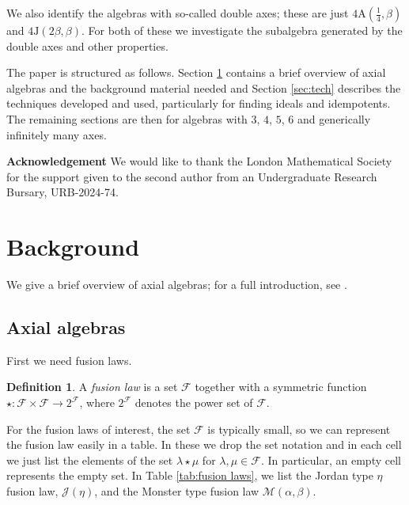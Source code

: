 \documentclass[11pt, a4paper]{article}
\theoremstyle{plain}
\theoremstyle{definition}
\newtheorem{definition}[theorem]{Definition}
\newcommand\al{\alpha}
\newcommand\bt{\beta}
\newcommand\lm{\lambda}
\newcommand\cF{\mathcal{F}}
\newcommand\cJ{\mathcal{J}}
\newcommand\cM{\mathcal{M}}
\newcommand{\A}{\mathrm{A}}
\newcommand{\J}{\mathrm{J}}
\newcommand{\0}{\overline{0}}
\newcommand{\2}{\overline{2}}
\newcommand{\1}{\mathbbm{1}}
\begin{document}
We also identify the algebras with so-called double axes; these are just $4\A(\frac{1}{4}, \bt)$ and $4\J(2\bt, \bt)$.  For both of these we investigate the subalgebra generated by the double axes and other properties.

The paper is structured as follows.  Section \ref{sec:background} contains a brief overview of axial algebras and the background material needed and Section \ref{sec:tech} describes the techniques developed and used, particularly for finding ideals and idempotents.  The remaining sections are then for algebras with $3$, $4$, $5$, $6$ and generically infinitely many axes.

\medskip

\noindent \textbf{Acknowledgement} We would like to thank the London Mathematical Society for the support given to the second author from an Undergraduate Research Bursary, URB-2024-74.

\section{Background}\label{sec:background}

We give a brief overview of axial algebras; for a full introduction, see \cite{survey}.

\subsection{Axial algebras}
First we need fusion laws.

\begin{definition}
A \emph{fusion law} is a set $\cF$ together with a symmetric function $\star \colon \cF \times \cF \to 2^\cF$, where $2^\cF$ denotes the power set of $\cF$.
\end{definition}

For the fusion laws of interest, the set $\cF$ is typically small, so we can represent the fusion law easily in a table.  In these we drop the set notation and in each cell we just list the elements of the set $\lm \star \mu$ for $\lm, \mu \in \cF$.  In particular, an empty cell represents the empty set.  In Table \ref{tab:fusion laws}, we list the Jordan type $\eta$ fusion law, $\cJ(\eta)$, and the Monster type fusion law $\cM(\al, \bt)$.
\end{document}
